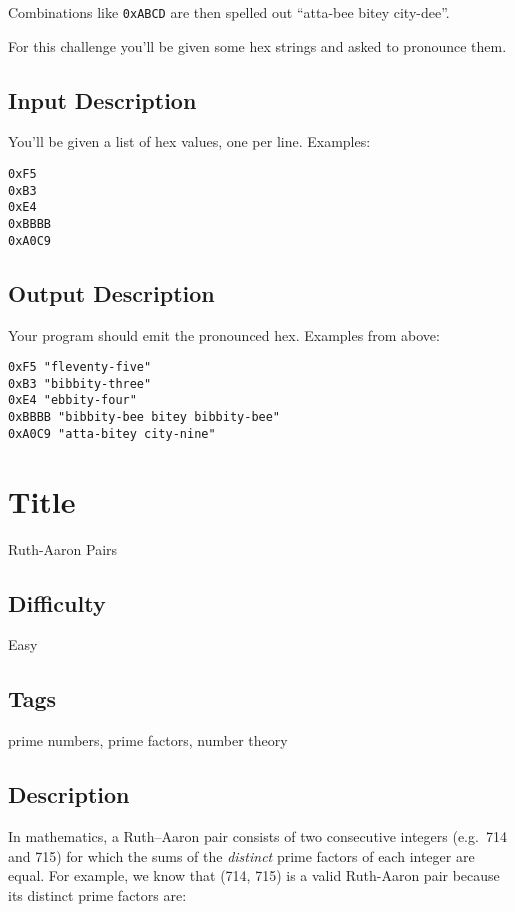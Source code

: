 Combinations like \texttt{0xABCD} are then spelled out ``atta-bee bitey
city-dee''.

For this challenge you'll be given some hex strings and asked to
pronounce them.

\subsection{Input Description}\label{input-description-5}

You'll be given a list of hex values, one per line. Examples:

\begin{verbatim}
0xF5
0xB3
0xE4
0xBBBB
0xA0C9 
\end{verbatim}

\subsection{Output Description}\label{output-description-5}

Your program should emit the pronounced hex. Examples from above:

\begin{verbatim}
0xF5 "fleventy-five"
0xB3 "bibbity-three"
0xE4 "ebbity-four"
0xBBBB "bibbity-bee bitey bibbity-bee"
0xA0C9 "atta-bitey city-nine"
\end{verbatim}

\section{Title}\label{title-7}

Ruth-Aaron Pairs

\subsection{Difficulty}\label{difficulty-7}

Easy

\subsection{Tags}\label{tags-7}

prime numbers, prime factors, number theory

\subsection{Description}\label{description-7}

In mathematics, a Ruth--Aaron pair consists of two consecutive integers
(e.g.~714 and 715) for which the sums of the \emph{distinct} prime
factors of each integer are equal. For example, we know that (714, 715)
is a valid Ruth-Aaron pair because its distinct prime factors are:

